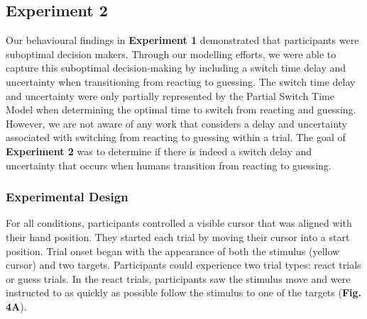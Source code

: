 \documentclass[man,donotrepeattitle,floatsintext,letterpaper,12pt]{apa7}
\newcommand\boldblue[1]{\textcolor{mydarkblue}{\textbf{#1}}}
\begin{document}
\subsection{Experiment 2}

\noindent Our behavioural findings in \boldblue{Experiment 1} demonstrated that participants were suboptimal decision makers. Through our modelling efforts, we were able to capture this suboptimal decision-making by including a switch time delay and uncertainty when transitioning from reacting to guessing. The switch time delay and uncertainty were only partially represented by the Partial Switch Time Model when determining the optimal time to switch from reacting and guessing. However, we are not aware of any work that considers a delay and uncertainty associated with switching from reacting to guessing within a trial. The goal of \boldblue{Experiment 2} was to determine if there is indeed a switch delay and uncertainty that occurs when humans transition from reacting to guessing.

\subsubsection{Experimental Design}

\noindent For all conditions, participants controlled a visible cursor that was aligned with their hand position. They started each trial by moving their cursor into a start position. Trial onset began with the appearance of both the stimulus (yellow cursor) and two targets. Participants could experience two trial types: react trials or guess trials. In the react trials, participants saw the stimulus move and were instructed to as quickly as possible follow the stimulus to one of the targets (\boldblue{Fig. 4A}). 
\end{document}
